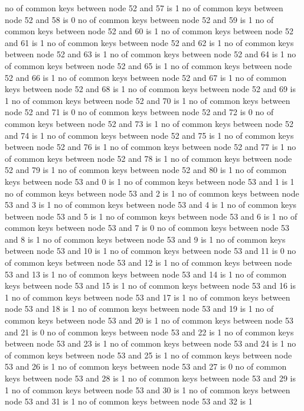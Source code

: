 no of common keys between node 52 and 57 is 1
no of common keys between node 52 and 58 is 0
no of common keys between node 52 and 59 is 1
no of common keys between node 52 and 60 is 1
no of common keys between node 52 and 61 is 1
no of common keys between node 52 and 62 is 1
no of common keys between node 52 and 63 is 1
no of common keys between node 52 and 64 is 1
no of common keys between node 52 and 65 is 1
no of common keys between node 52 and 66 is 1
no of common keys between node 52 and 67 is 1
no of common keys between node 52 and 68 is 1
no of common keys between node 52 and 69 is 1
no of common keys between node 52 and 70 is 1
no of common keys between node 52 and 71 is 0
no of common keys between node 52 and 72 is 0
no of common keys between node 52 and 73 is 1
no of common keys between node 52 and 74 is 1
no of common keys between node 52 and 75 is 1
no of common keys between node 52 and 76 is 1
no of common keys between node 52 and 77 is 1
no of common keys between node 52 and 78 is 1
no of common keys between node 52 and 79 is 1
no of common keys between node 52 and 80 is 1
no of common keys between node 53 and 0 is 1
no of common keys between node 53 and 1 is 1
no of common keys between node 53 and 2 is 1
no of common keys between node 53 and 3 is 1
no of common keys between node 53 and 4 is 1
no of common keys between node 53 and 5 is 1
no of common keys between node 53 and 6 is 1
no of common keys between node 53 and 7 is 0
no of common keys between node 53 and 8 is 1
no of common keys between node 53 and 9 is 1
no of common keys between node 53 and 10 is 1
no of common keys between node 53 and 11 is 0
no of common keys between node 53 and 12 is 1
no of common keys between node 53 and 13 is 1
no of common keys between node 53 and 14 is 1
no of common keys between node 53 and 15 is 1
no of common keys between node 53 and 16 is 1
no of common keys between node 53 and 17 is 1
no of common keys between node 53 and 18 is 1
no of common keys between node 53 and 19 is 1
no of common keys between node 53 and 20 is 1
no of common keys between node 53 and 21 is 0
no of common keys between node 53 and 22 is 1
no of common keys between node 53 and 23 is 1
no of common keys between node 53 and 24 is 1
no of common keys between node 53 and 25 is 1
no of common keys between node 53 and 26 is 1
no of common keys between node 53 and 27 is 0
no of common keys between node 53 and 28 is 1
no of common keys between node 53 and 29 is 1
no of common keys between node 53 and 30 is 1
no of common keys between node 53 and 31 is 1
no of common keys between node 53 and 32 is 1
